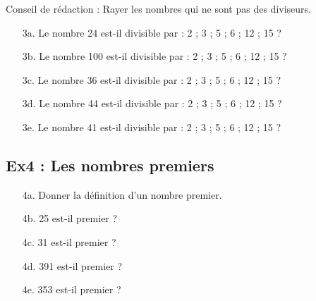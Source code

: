 Conseil de rédaction : Rayer les nombres qui ne sont pas des diviseurs.

\begin{enumerate}
  \item[3a.] Le nombre 24 est-il divisible par : 2 ; 3 ; 5 ; 6 ; 12 ; 15 ?
  \item[3b.] Le nombre 100 est-il divisible par : 2 ; 3 ; 5 ; 6 ; 12 ; 15 ?
  \item[3c.] Le nombre 36 est-il divisible par : 2 ; 3 ; 5 ; 6 ; 12 ; 15 ?
  \item[3d.] Le nombre 44 est-il divisible par : 2 ; 3 ; 5 ; 6 ; 12 ; 15 ?
  \item[3e.] Le nombre 41 est-il divisible par : 2 ; 3 ; 5 ; 6 ; 12 ; 15 ?
\end{enumerate}

\subsection*{Ex4 : Les nombres premiers}

\begin{enumerate}
  \item[4a.] Donner la définition d'un nombre premier. 
  \item[4b.] 25 est-il premier ?
  \item[4c.] 31 est-il premier ?
  \item[4d.] 391 est-il premier ?
  \item[4e.] 353 est-il premier ? 
\end{enumerate}


